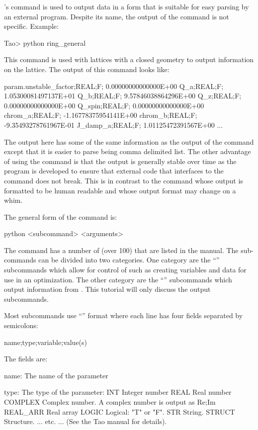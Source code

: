\documentclass{hitec}     %
\begin{document}
{\tao's  command is used to output data in a form that is suitable for easy parsing by an
external program. Despite its name, the output of the  command is not  specific.
Example:
\begin{code}
Tao> python ring_general
\end{code}
This command is used with lattices with a closed geometry to output information on the lattice.
The output of this command looks like:
\begin{code}
param.unstable_factor;REAL;F;  0.00000000000000E+00
Q_a;REAL;F;  1.05300081497137E+01
Q_b;REAL;F;  9.57846038864296E+00
Q_z;REAL;F;  0.00000000000000E+00
Q_spin;REAL;F;  0.00000000000000E+00
chrom_a;REAL;F; -1.16778375954141E+00
chrom_b;REAL;F; -9.35493278761967E-01
J_damp_a;REAL;F;  1.01125472391567E+00
...
\end{code}
The output here has some of the same information as the output of the  command
except that it is easier to parse being comma delimited list. The other advantage of using the
 command is that the output is generally stable over time as the \tao program is
developed to ensure that external code that interfaces to the  command does not break.
This is in contrast to the  command whose output is formatted to be human readable and whose
output format may change on a whim.

The general form of the  command is:
\begin{code}
  python <subcommand> <arguments>
\end{code}
The  command has a number of  (over 100) that are listed in the \tao
manual. The sub-commands can be divided into two categories. One category are the ``''
subcommands which allow for control of \tao such as creating variables and data for use in an
optimization. The other category are the ``'' subcommands which output information from
\tao. This tutorial will only discuss the output subcommands.

Most  subcommands use ``'' format where each line has four fields
separated by semicolons:
\begin{code}
  {name};{type};{variable};{value(s)}
\end{code}
The fields are:
\begin{code}
name:       The name of the parameter

type:       The type of the parameter:
  INT           Integer number
  REAL          Real number
  COMPLEX       Complex number. A complex number is output as Re;Im
  REAL_ARR      Real array
  LOGIC         Logical: "T" or "F".
  STR           String.
  STRUCT        Structure. 
  ... etc. ... (See the Tao manual for details).


\end{code}}
\end{document}
